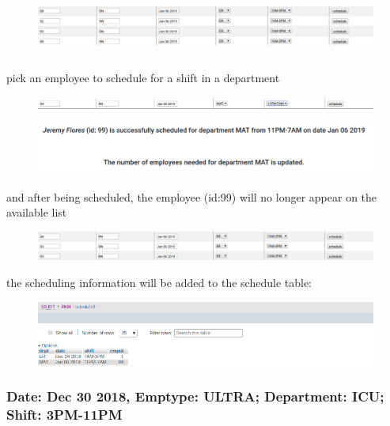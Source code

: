 \documentclass[11pt]{article}
\makeatletter
\def\maxwidth{\ifdim\Gin@nat@width>\linewidth\linewidth
    \else\Gin@nat@width\fi}
\let\Oldincludegraphics\includegraphics
\renewcommand{\includegraphics}[1]{\Oldincludegraphics[width=.8\maxwidth]{#1}}
\makeatother
\begin{document}
\begin{figure}[H]
	\centering
	\includegraphics{20.png}
	\caption{}
\end{figure}

\[\]

pick an employee to schedule for a shift in a department

\begin{figure}[H]
	\centering
	\includegraphics{21.png}
	\caption{}
\end{figure}

\begin{figure}[H]
\centering
\includegraphics{22.png}
\caption{}
\end{figure}

and after being scheduled, the employee (id:99) will no longer appear on
the available list 

\begin{figure}[H]
	\centering
	\includegraphics{23.png}
	\caption{}
\end{figure}

the scheduling information will be added to the schedule table:

\begin{figure}[H]
\centering
\includegraphics{24.png}
\caption{}
\end{figure}

    \subsubsection*{Date: Dec 30 2018, Emptype: ULTRA; Department: ICU; Shift:
3PM-11PM}\label{date-dec-30-2018-emptype-ultra-department-icu-shift-3pm-11pm}
\end{document}
